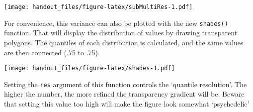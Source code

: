 \documentclass[]{article}
\newenvironment{Shaded}{\begin{snugshade}}{\end{snugshade}}
\newcommand{\DataTypeTok}[1]{\textcolor[rgb]{0.13,0.29,0.53}{#1}}
\newcommand{\DecValTok}[1]{\textcolor[rgb]{0.00,0.00,0.81}{#1}}
\newcommand{\KeywordTok}[1]{\textcolor[rgb]{0.13,0.29,0.53}{\textbf{#1}}}
\newcommand{\NormalTok}[1]{#1}
\newcommand{\OperatorTok}[1]{\textcolor[rgb]{0.81,0.36,0.00}{\textbf{#1}}}
\newcommand{\StringTok}[1]{\textcolor[rgb]{0.31,0.60,0.02}{#1}}
\begin{document}
\texttt{[image: handout\_files/figure-latex/subMultiRes-1.pdf]}

For convenience, this variance can also be plotted with the new
\texttt{shades()} function. That will display the distribution of values
by drawing transparent polygons. The quantiles of each distribution is
calculated, and the same values are then connected (.75 to .75).

\begin{Shaded}
\end{Shaded}

\texttt{[image: handout\_files/figure-latex/shades-1.pdf]}

Setting the \texttt{res} argument of this function controls the
`quantile resolution'. The higher the number, the more refined the
transparency gradient will be. Beware that setting this value too high
will make the figure look somewhat `psychedelic'

\begin{Shaded}
\end{Shaded}
\end{document}
